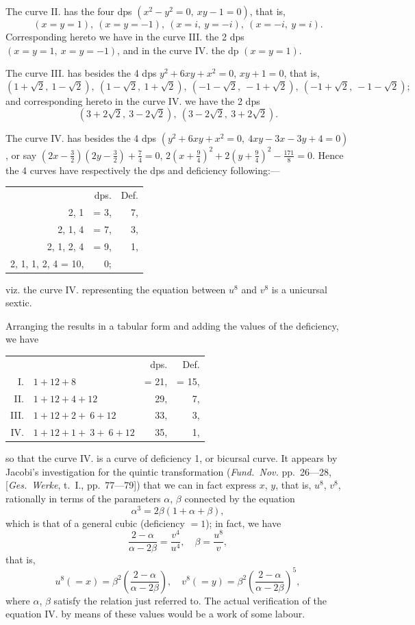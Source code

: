 \documentclass[12pt,a4paper]{article}
\begin{document}
The curve II. has the four dps $(x^2 - y^2 = 0, \ xy - 1 = 0)$, that is,
\[
(x = y = 1), \ (x = y = -1), \ (x = i, \ y = -i), \ (x = -i, \ y = i).
\]
Corresponding hereto we have in the curve III. the 2 dps $(x = y = 1, \ x = y = -1)$, and in the curve IV. the dp $(x = y = 1)$.

The curve III. has besides the 4 dps $y^2 + 6xy + x^2 = 0$, $xy + 1 = 0$, that is,
\[
(1 + \sqrt{2}, \ 1 - \sqrt{2}), \ (1 - \sqrt{2}, \ 1 + \sqrt{2}), \ (-1 - \sqrt{2}, \ -1 + \sqrt{2}), \ (-1 + \sqrt{2}, \ -1 - \sqrt{2});
\]
and corresponding hereto in the curve IV. we have the 2 dps
\[
(3 + 2\sqrt{2}, \ 3 - 2\sqrt{2}), \ (3 - 2\sqrt{2}, \ 3 + 2\sqrt{2}).
\]

The curve IV. has besides the 4 dps $(y^2 + 6xy + x^2 = 0, \ 4xy - 3x - 3y + 4 = 0)$, or say $(2x - \frac{3}{2})(2y - \frac{3}{2}) + \frac{7}{4} = 0$, $2(x + \frac{9}{4})^2 + 2(y + \frac{9}{4})^2 - \frac{171}{8} = 0$. Hence the 4 curves have respectively the dps and deficiency following:---
\begin{center}
\begin{tabular}{r@{\quad}r@{\quad}r}
& dps. & Def. \\
2, 1 & = 3, & 7, \\
2, 1, 4 & = 7, & 3, \\
2, 1, 2, 4 & = 9, & 1, \\
2, 1, 1, 2, 4 = 10, & 0;
\end{tabular}
\end{center}
viz. the curve IV. representing the equation between $u^8$ and $v^8$ is a unicursal sextic.

Arranging the results in a tabular form and adding the values of the deficiency, we have
\begin{center}
\begin{tabular}{r@{\quad}l@{\quad}r@{\quad}r}
& & dps. & Def. \\
I. & $1 + 12 + 8$ & = 21, & = 15, \\
II. & $1 + 12 + 4 + 12$ & 29, & 7, \\
III. & $1 + 12 + 2 + \ 6 + 12$ & 33, & 3, \\
IV. & $1 + 12 + 1 + \ 3 + \ 6 + 12$ & 35, & 1,
\end{tabular}
\end{center}
so that the curve IV. is a curve of deficiency 1, or bicursal curve. It appears by Jacobi's investigation for the quintic transformation (\textit{Fund.~Nov.} pp.~26---28, [\textit{Ges.~Werke}, t.~I., pp.~77---79]) that we can in fact express $x$, $y$, that is, $u^8$, $v^8$, rationally in terms of the parameters $\alpha$, $\beta$ connected by the equation
\[
\alpha^3 = 2\beta(1 + \alpha + \beta),
\]
which is that of a general cubic (deficiency $= 1$); in fact, we have
\[
\frac{2 - \alpha}{\alpha - 2\beta} = \frac{v^4}{u^4}, \quad \beta = \frac{u^8}{v},
\]
that is,
\[
u^8(= x) = \beta^2\left(\frac{2 - \alpha}{\alpha - 2\beta}\right), \quad v^8(= y) = \beta^2\left(\frac{2 - \alpha}{\alpha - 2\beta}\right)^5,
\]
where $\alpha$, $\beta$ satisfy the relation just referred to. The actual verification of the equation IV. by means of these values would be a work of some labour.
\end{document}

